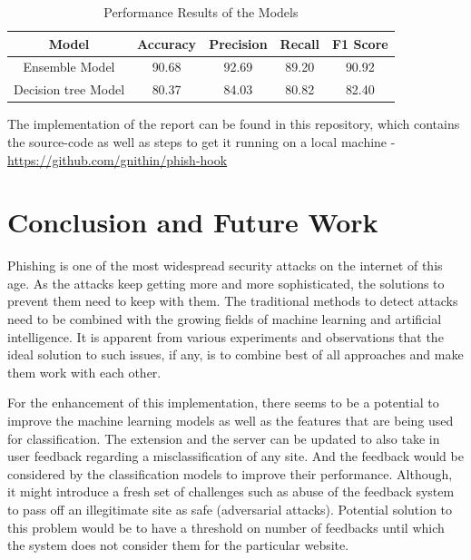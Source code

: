 \documentclass[conference]{IEEEtran}
\begin{document}
\begin{table}[htbp]
    \caption{Performance Results of the Models}
    \begin{center}
    \begin{tabular}{|c|c|c|c|c|}
    \hline
    \textbf{Model} & \textbf{Accuracy}& \textbf{Precision}& \textbf{Recall}& \textbf{F1 Score} \\
    \hline
    Ensemble Model\cite{GregaDataset}& 90.68& 92.69 & 89.20 & 90.92\\
    \hline
    Decision tree Model\cite{UCIDataset}& 80.37& 84.03 & 80.82 & 82.40 \\
    \hline
    \end{tabular}
    \label{tab1}
    \end{center}
    \end{table}
    

\par The implementation of the report can be found in this repository, which contains the source-code as well as steps to get it running on a local machine - \href{https://github.com/gnithin/phish-hook}{https://github.com/gnithin/phish-hook}

\section{Conclusion and Future Work}
\par Phishing is one of the most widespread security attacks on the internet of this age.
As the attacks keep getting more and more sophisticated, the solutions to prevent them need to keep with them.
The traditional methods to detect attacks need to be combined with the growing fields of machine learning and artificial intelligence.
It is apparent from various experiments and observations that the ideal solution to such issues, if any, is to combine best of all approaches and make them work with each other.

\par For the enhancement of this implementation, there seems to be a potential to improve the machine learning models as well as the features that are being used for classification.
The extension and the server can be updated to also take in user feedback regarding a misclassification of any site.
And the feedback would be considered by the classification models to improve their performance.
Although, it might introduce a fresh set of challenges such as abuse of the feedback system to pass off an illegitimate site as safe (adversarial attacks).
Potential solution to this problem would be to have a threshold on number of feedbacks until which the system does not consider them for the particular website.
\end{document}
